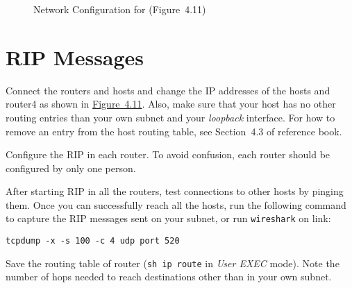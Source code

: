 \documentclass{../UTNetLab}
\begin{document}
\begin{figure}[H]
        \caption{Network Configuration for  (Figure~4.11)}\label{fig:4.11}
    \end{figure}
\section{RIP Messages}
    Connect the routers and hosts and change the IP addresses of the hosts and router4 as shown in \hyperref[fig:4.11]{Figure~4.11}.
    Also, make sure that your host has no other routing entries than your own subnet and your \textit{loopback} interface.
    For how to remove an entry from the host routing table, see Section~4.3 of reference book.

    Configure the RIP in each router.
    To avoid confusion, each router should be configured by only one person.

    After starting RIP in all the routers, test connections to other hosts by pinging them.
    Once you can successfully reach all the hosts, run the following command to capture the RIP messages sent on your subnet, or run \lstinline{wireshark} on link:
    \begin{lstlisting}[morekeywords={[3]udp,port}]
tcpdump -x -s 100 -c 4 udp port 520
    \end{lstlisting}

    Save the routing table of router (\lstinline{sh ip route} in \textit{User EXEC} mode).
    Note the number of hops needed to reach destinations other than in your own subnet.
\end{document}
